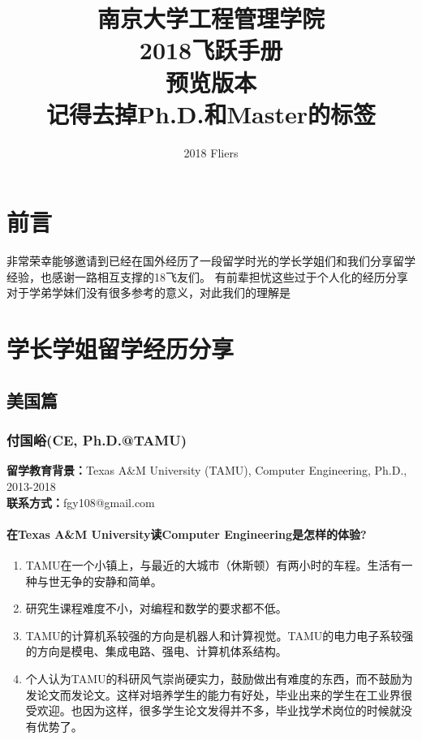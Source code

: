 \documentclass[a4paper,UTF8]{book}
\begin{document}
\title{南京大学工程管理学院\\2018飞跃手册\\预览版本\\记得去掉Ph.D.和Master的标签}
\author{2018 Fliers}
\maketitle %

\tableofcontents %

\chapter{前言}
非常荣幸能够邀请到已经在国外经历了一段留学时光的学长学姐们和我们分享留学经验，也感谢一路相互支撑的18飞友们。
有前辈担忧这些过于个人化的经历分享对于学弟学妹们没有很多参考的意义，对此我们的理解是
\clearpage

\chapter{学长学姐留学经历分享}  %
\clearpage
\section{美国篇}
\clearpage
\subsection{付国峪(CE, Ph.D.@TAMU)}
    \textbf{留学教育背景：}Texas A\&M University (TAMU), Computer Engineering, Ph.D., 2013-2018\\
    \textbf{联系方式：}fgy108@gmail.com

    \subsubsection*{在Texas A\&M University读Computer Engineering是怎样的体验?}
        \begin{enumerate}[itemindent=0pt,itemsep=0pt,parsep=0pt]
            \item TAMU在一个小镇上，与最近的大城市（休斯顿）有两小时的车程。生活有一种与世无争的安静和简单。
            \item 研究生课程难度不小，对编程和数学的要求都不低。
            \item TAMU的计算机系较强的方向是机器人和计算视觉。TAMU的电力电子系较强的方向是模电、集成电路、强电、计算机体系结构。
            \item 个人认为TAMU的科研风气崇尚硬实力，鼓励做出有难度的东西，而不鼓励为发论文而发论文。这样对培养学生的能力有好处，毕业出来的学生在工业界很受欢迎。也因为这样，很多学生论文发得并不多，毕业找学术岗位的时候就没有优势了。
        \end{enumerate}
\end{document}
